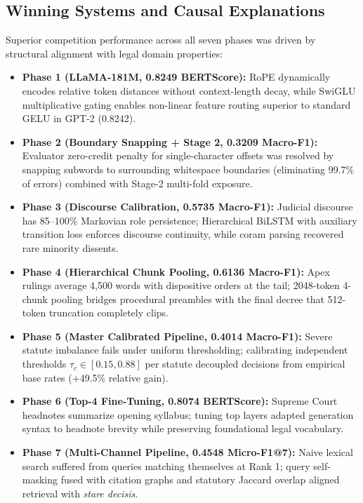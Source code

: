 \documentclass[11pt, oneside]{article}
\begin{document}
\subsection{Winning Systems and Causal Explanations}
Superior competition performance across all seven phases was driven by structural alignment with legal domain properties:
\begin{itemize}
    \item \textbf{Phase 1 (LLaMA-181M, 0.8249 BERTScore):} RoPE dynamically encodes relative token distances without context-length decay, while SwiGLU multiplicative gating enables non-linear feature routing superior to standard GELU in GPT-2 (0.8242).
    \item \textbf{Phase 2 (Boundary Snapping + Stage 2, 0.3209 Macro-F1):} Evaluator zero-credit penalty for single-character offsets was resolved by snapping subwords to surrounding whitespace boundaries (eliminating 99.7\% of errors) combined with Stage-2 multi-fold exposure.
    \item \textbf{Phase 3 (Discourse Calibration, 0.5735 Macro-F1):} Judicial discourse has 85--100\% Markovian role persistence; Hierarchical BiLSTM with auxiliary transition loss enforces discourse continuity, while coram parsing recovered rare minority dissents.
    \item \textbf{Phase 4 (Hierarchical Chunk Pooling, 0.6136 Macro-F1):} Apex rulings average 4,500 words with dispositive orders at the tail; 2048-token 4-chunk pooling bridges procedural preambles with the final decree that 512-token truncation completely clips.
    \item \textbf{Phase 5 (Master Calibrated Pipeline, 0.4014 Macro-F1):} Severe statute imbalance fails under uniform thresholding; calibrating independent thresholds $\tau_c \in [0.15, 0.88]$ per statute decoupled decisions from empirical base rates (+49.5\% relative gain).
    \item \textbf{Phase 6 (Top-4 Fine-Tuning, 0.8074 BERTScore):} Supreme Court headnotes summarize opening syllabus; tuning top layers adapted generation syntax to headnote brevity while preserving foundational legal vocabulary.
    \item \textbf{Phase 7 (Multi-Channel Pipeline, 0.4548 Micro-F1@7):} Naive lexical search suffered from queries matching themselves at Rank 1; query self-masking fused with citation graphs and statutory Jaccard overlap aligned retrieval with \emph{stare decisis}.
\end{itemize}
\end{document}
